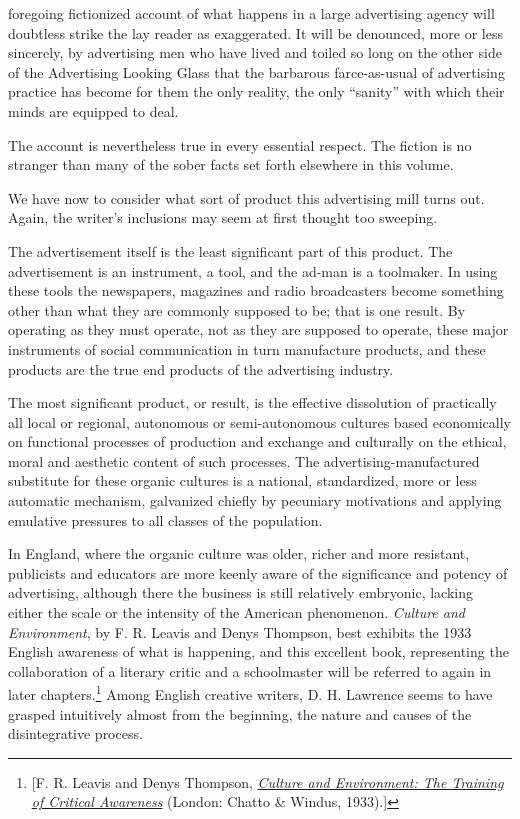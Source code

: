 \documentclass[openany,nobib]{tufte-book}
\begin{document}
 foregoing fictionized account of what happens in a large advertising
agency will doubtless strike the lay reader as exaggerated. It will be
denounced, more or less sincerely, by advertising men who have lived and
toiled so long on the other side of the Advertising Looking Glass that
the barbarous farce-as-usual of advertising practice has become for them
the only reality, the only ``sanity'' with which their minds are
equipped to deal.

The account is nevertheless true in every essential respect. The fiction
is no stranger than many of the sober facts set forth elsewhere in this
volume.

We have now to consider what sort of product this advertising mill turns
out. Again, the writer's inclusions may seem at first thought too
sweeping.

The advertisement itself is the least significant part of this product.
The advertisement is an instrument, a tool, and the ad-man is a
toolmaker. In using these tools the newspapers, magazines and radio
broadcasters become something other than what they are commonly supposed
to be; that is one result. By operating as they must operate, not as
they are supposed to operate, these major instruments of social
communication in turn manufacture products, and these products are the
true end products of the advertising industry.

The most significant product, or result, is the effective dissolution of
practically all local or regional, autonomous or semi-autonomous
cultures based economically on functional processes of production and
exchange and culturally on the ethical, moral and aesthetic content of
such processes. The advertising-manufactured substitute for these
organic cultures is a national, standardized, more or less automatic
mechanism, galvanized chiefly by pecuniary motivations and applying
emulative pressures to all classes of the population.

In England, where the organic culture was older, richer and more
resistant, publicists and educators are more keenly aware of the
significance and potency of advertising, although there the business is
still relatively embryonic, lacking either the scale or the intensity of
the American phenomenon. \emph{Culture and Environment}, by F. R. Leavis
and Denys Thompson, best exhibits the 1933 English awareness of what is
happening, and this excellent book, representing the collaboration of a
literary critic and a schoolmaster will be referred to again in later
chapters.\footnote{{[}F. R. Leavis and Denys Thompson,
  \emph{\href{http://www.worldcat.org/oclc/188346}{Culture and
  Environment: The Training of Critical Awareness}} (London: Chatto \&
  Windus, 1933).{]}} Among English creative writers, D. H. Lawrence seems to
have grasped intuitively almost from the beginning, the nature and
causes of the disintegrative process.
\end{document}
